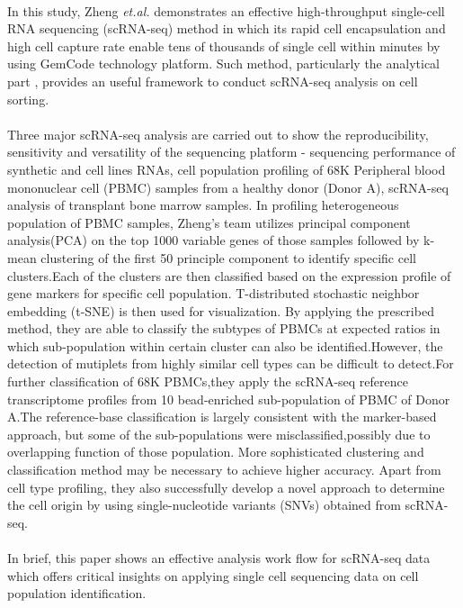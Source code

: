 

%
%
  
\medskip

\paragraph{}
In this study, Zheng \textit{et.al.} demonstrates an effective high-throughput single-cell RNA sequencing (scRNA-seq) method in which its rapid cell encapsulation and high cell capture rate enable tens of thousands of single cell within minutes by using GemCode technology platform. Such method, particularly the analytical part , provides an useful framework to conduct scRNA-seq analysis on cell sorting.
\\

\paragraph{}
Three major scRNA-seq analysis are carried out to show the reproducibility, sensitivity and versatility of the sequencing platform - sequencing performance of synthetic and cell lines RNAs, cell population profiling of 68K Peripheral blood mononuclear cell (PBMC) samples from a healthy donor (Donor A), scRNA-seq analysis of transplant bone marrow samples. In profiling heterogeneous population of PBMC samples, Zheng's team utilizes principal component analysis(PCA) on the top 1000 variable genes of those samples followed by k-mean clustering of the first 50 principle component to identify specific cell clusters.Each of the clusters are then classified based on the expression profile of gene markers for specific cell population. T-distributed stochastic neighbor embedding (t-SNE) is then used for visualization. By applying the prescribed method, they are able to classify the subtypes of PBMCs at expected ratios in which sub-population within certain cluster can also be identified.However, the detection of mutiplets from highly similar cell types can be difficult to detect.For further classification of 68K PBMCs,they apply the scRNA-seq reference transcriptome profiles from 10 bead-enriched sub-population of PBMC of Donor A.The reference-base classification is largely consistent with the marker-based approach, but some of the sub-populations were misclassified,possibly due to overlapping function of those population. More sophisticated clustering and classification method may be necessary to achieve higher accuracy. Apart from cell type profiling, they also successfully develop a novel approach to determine the cell origin by using single-nucleotide variants (SNVs) obtained from scRNA-seq. \\

\paragraph{}
In brief, this paper shows an effective analysis work flow for scRNA-seq data which offers critical insights on applying single cell sequencing data on cell population identification. 

